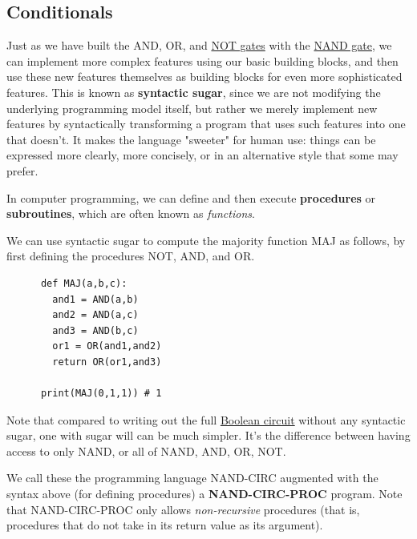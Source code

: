 \subsection{Conditionals}

  Just as we have built the AND, OR, and \hyperref[def:not-gate]{NOT gates} with the \hyperref[def:nand-gate]{NAND gate}, we can implement more complex features using our basic building blocks, and then use these new features themselves as building blocks for even more sophisticated features. This is known as \textbf{syntactic sugar}, since we are not modifying the underlying programming model itself, but rather we merely implement new features by syntactically transforming a program that uses such features into one that doesn’t. It makes the language "sweeter" for human use: things can be expressed more clearly, more concisely, or in an alternative style that some may prefer.

  In computer programming, we can define and then execute \textbf{procedures} or \textbf{subroutines}, which are often known as \textit{functions}. 

  \begin{example}
    \label{ex:syntactic-sugar-to-define-majority-function}
    We can use syntactic sugar to compute the majority function MAJ as follows, by first defining the procedures NOT, AND, and OR. 
    \begin{lstlisting}
      def MAJ(a,b,c): 
        and1 = AND(a,b)
        and2 = AND(a,c) 
        and3 = AND(b,c)
        or1 = OR(and1,and2) 
        return OR(or1,and3)

      print(MAJ(0,1,1)) # 1
    \end{lstlisting}
  \end{example}

  Note that compared to writing out the full \hyperref[def:boolean-circuit]{Boolean circuit} without any syntactic sugar, one with sugar will can be much simpler. It's the difference between having access to only NAND, or all of NAND, AND, OR, NOT. 

  \begin{definition}
    \label{def:nand-circ-proc}
    We call these the programming language NAND-CIRC augmented with the syntax above (for defining procedures) a \textbf{NAND-CIRC-PROC} program. Note that NAND-CIRC-PROC only allows \textit{non-recursive} procedures (that is, procedures that do not take in its return value as its argument). 
  \end{definition}

